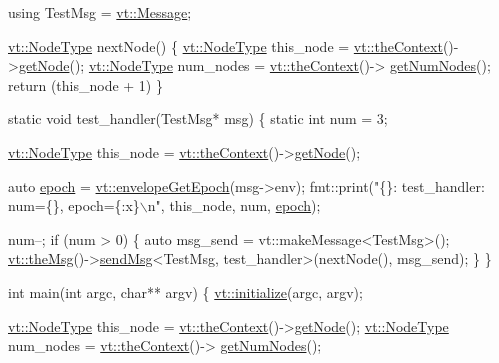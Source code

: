 \begin{DoxyCodeInclude}
\textcolor{keyword}{using} TestMsg = \hyperlink{namespacevt_a3a3ddfef40b4c90915fa43cdd5f129ea}{vt::Message};

\hyperlink{namespacevt_a866da9d0efc19c0a1ce79e9e492f47e2}{vt::NodeType} nextNode() \{
  \hyperlink{namespacevt_a866da9d0efc19c0a1ce79e9e492f47e2}{vt::NodeType} this\_node = \hyperlink{namespacevt_a26551fe0e6e6a1371111df5b12c7e92c}{vt::theContext}()->\hyperlink{structvt_1_1ctx_1_1_context_a0d52c263ce8516546a67443d9a86fa5f}{getNode}();
  \hyperlink{namespacevt_a866da9d0efc19c0a1ce79e9e492f47e2}{vt::NodeType} num\_nodes = \hyperlink{namespacevt_a26551fe0e6e6a1371111df5b12c7e92c}{vt::theContext}()->
      \hyperlink{structvt_1_1ctx_1_1_context_a7f41071aadf6d5fa9e1b6c703c5ff19d}{getNumNodes}();
  \textcolor{keywordflow}{return} (this\_node + 1) %
\}

\textcolor{keyword}{static} \textcolor{keywordtype}{void} test\_handler(TestMsg* msg) \{
  \textcolor{keyword}{static} \textcolor{keywordtype}{int} num = 3;

  \hyperlink{namespacevt_a866da9d0efc19c0a1ce79e9e492f47e2}{vt::NodeType} this\_node = \hyperlink{namespacevt_a26551fe0e6e6a1371111df5b12c7e92c}{vt::theContext}()->\hyperlink{structvt_1_1ctx_1_1_context_a0d52c263ce8516546a67443d9a86fa5f}{getNode}();

  \textcolor{keyword}{auto} \hyperlink{namespacevt_1_1config_a6bd1d6215bda0d8ca02811798399f689a05bdb92281360bcbfdf239ad3ccbde19}{epoch} = \hyperlink{namespacevt_ad5495e7900227550b44837e899c5bb13}{vt::envelopeGetEpoch}(msg->env);
  fmt::print(\textcolor{stringliteral}{"\{\}: test\_handler: num=\{\}, epoch=\{:x\}\(\backslash\)n"}, this\_node, num, \hyperlink{namespacevt_1_1config_a6bd1d6215bda0d8ca02811798399f689a05bdb92281360bcbfdf239ad3ccbde19}{epoch});

  num--;
  \textcolor{keywordflow}{if} (num > 0) \{
    \textcolor{keyword}{auto} msg\_send = vt::makeMessage<TestMsg>();
    \hyperlink{namespacevt_aeafd31f866aeb4dc6fc2f6ee97136350}{vt::theMsg}()->\hyperlink{group__preregister_ga0162a39473e7f9b490a79a7983d949ac}{sendMsg}<TestMsg, test\_handler>(nextNode(), msg\_send);
  \}
\}

\textcolor{keywordtype}{int} main(\textcolor{keywordtype}{int} argc, \textcolor{keywordtype}{char}** argv) \{
  \hyperlink{namespacevt_aae6ab5af3e11886ce73c4c3ffa008201}{vt::initialize}(argc, argv);

  \hyperlink{namespacevt_a866da9d0efc19c0a1ce79e9e492f47e2}{vt::NodeType} this\_node = \hyperlink{namespacevt_a26551fe0e6e6a1371111df5b12c7e92c}{vt::theContext}()->\hyperlink{structvt_1_1ctx_1_1_context_a0d52c263ce8516546a67443d9a86fa5f}{getNode}();
  \hyperlink{namespacevt_a866da9d0efc19c0a1ce79e9e492f47e2}{vt::NodeType} num\_nodes = \hyperlink{namespacevt_a26551fe0e6e6a1371111df5b12c7e92c}{vt::theContext}()->
      \hyperlink{structvt_1_1ctx_1_1_context_a7f41071aadf6d5fa9e1b6c703c5ff19d}{getNumNodes}();


\end{DoxyCodeInclude}
